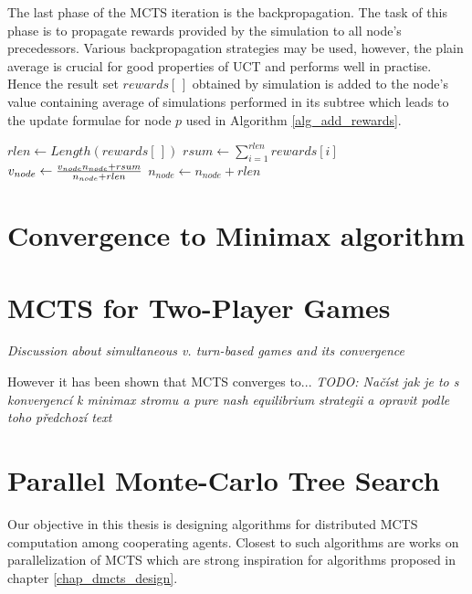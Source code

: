 The last phase of the MCTS iteration is the backpropagation. The task of this phase is to propagate
rewards provided by the simulation to all node's precedessors. Various backpropagation strategies
may be used, however, the plain average is crucial for good properties of UCT and performs
well in
practise. Hence the result set $rewards[\,]$ obtained by simulation is added to the node's value containing
average of simulations performed in its subtree which leads to the update formulae for
node $p$ used in Algorithm \ref{alg_add_rewards}.

\begin{algorithm}
\DontPrintSemicolon
\caption{$AddRewards(node,rewards[\,])$\label{alg_add_rewards}}
$rlen \leftarrow Length(rewards[\,])$\;
$rsum \leftarrow \sum\limits_{i=1}^{rlen} rewards[i]$\;
$v_{node} \leftarrow {{v_{node} n_{node} + rsum}
    \over{n_{node} + rlen}}$\;
$n_{node} \leftarrow n_{node} + rlen$\;
\end{algorithm}



\section{Convergence to Minimax algorithm}
\label{sec_minimax_convergence}



\section{MCTS for Two-Player Games}
\emph{Discussion about simultaneous v. turn-based games and its convergence}

However it has been shown that MCTS converges to... \emph{TODO: Načíst jak je to s konvergencí k
minimax stromu a pure nash equilibrium strategii a opravit podle toho předchozí text}


\section{Parallel Monte-Carlo Tree Search}
\label{sec_parallel_mcts}


Our objective in this thesis is designing algorithms for distributed MCTS computation among
cooperating agents. Closest to such algorithms are works on parallelization of MCTS which are
strong inspiration for algorithms proposed in chapter \ref{chap_dmcts_design}.

